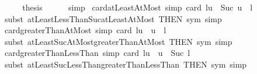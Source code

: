 \begin{isabellebody}
\ \ \isamarkupfalse%
\ \isamarkupfalse%
\ {\isacharquery}{\kern0pt}thesis\isanewline
\ \ \ \ \isamarkupfalse%
\ simp\isanewline
{}\isamarkupfalse%
%
\endisatagproof
{\isafoldproof}%
%
\isadelimproof
\isanewline
%
\endisadelimproof
\isanewline
{}\isamarkupfalse%
\ card{\isacharunderscore}{\kern0pt}atLeastAtMost\ {\isacharbrackleft}{\kern0pt}simp{\isacharbrackright}{\kern0pt}{\isacharcolon}{\kern0pt}\ {\isachardoublequoteopen}card\ {\isacharbraceleft}{\kern0pt}l{\isachardot}{\kern0pt}{\isachardot}{\kern0pt}u{\isacharbraceright}{\kern0pt}\ {\isacharequal}{\kern0pt}\ Suc\ u\ {\isacharminus}{\kern0pt}\ l{\isachardoublequoteclose}\isanewline
%
\isadelimproof
\ \ %
\endisadelimproof
%
\isatagproof
{}\isamarkupfalse%
\ {\isacharparenleft}{\kern0pt}subst\ atLeastLessThanSuc{\isacharunderscore}{\kern0pt}atLeastAtMost\ {\isacharbrackleft}{\kern0pt}THEN\ sym{\isacharbrackright}{\kern0pt}{\isacharcomma}{\kern0pt}\ simp{\isacharparenright}{\kern0pt}%
\endisatagproof
{\isafoldproof}%
%
\isadelimproof
\isanewline
%
\endisadelimproof
\isanewline
{}\isamarkupfalse%
\ card{\isacharunderscore}{\kern0pt}greaterThanAtMost\ {\isacharbrackleft}{\kern0pt}simp{\isacharbrackright}{\kern0pt}{\isacharcolon}{\kern0pt}\ {\isachardoublequoteopen}card\ {\isacharbraceleft}{\kern0pt}l{\isacharless}{\kern0pt}{\isachardot}{\kern0pt}{\isachardot}{\kern0pt}u{\isacharbraceright}{\kern0pt}\ {\isacharequal}{\kern0pt}\ u\ {\isacharminus}{\kern0pt}\ l{\isachardoublequoteclose}\isanewline
%
\isadelimproof
\ \ %
\endisadelimproof
%
\isatagproof
{}\isamarkupfalse%
\ {\isacharparenleft}{\kern0pt}subst\ atLeastSucAtMost{\isacharunderscore}{\kern0pt}greaterThanAtMost\ {\isacharbrackleft}{\kern0pt}THEN\ sym{\isacharbrackright}{\kern0pt}{\isacharcomma}{\kern0pt}\ simp{\isacharparenright}{\kern0pt}%
\endisatagproof
{\isafoldproof}%
%
\isadelimproof
\isanewline
%
\endisadelimproof
\isanewline
{}\isamarkupfalse%
\ card{\isacharunderscore}{\kern0pt}greaterThanLessThan\ {\isacharbrackleft}{\kern0pt}simp{\isacharbrackright}{\kern0pt}{\isacharcolon}{\kern0pt}\ {\isachardoublequoteopen}card\ {\isacharbraceleft}{\kern0pt}l{\isacharless}{\kern0pt}{\isachardot}{\kern0pt}{\isachardot}{\kern0pt}{\isacharless}{\kern0pt}u{\isacharbraceright}{\kern0pt}\ {\isacharequal}{\kern0pt}\ u\ {\isacharminus}{\kern0pt}\ Suc\ l{\isachardoublequoteclose}\isanewline
%
\isadelimproof
\ \ %
\endisadelimproof
%
\isatagproof
{}\isamarkupfalse%
\ {\isacharparenleft}{\kern0pt}subst\ atLeastSucLessThan{\isacharunderscore}{\kern0pt}greaterThanLessThan\ {\isacharbrackleft}{\kern0pt}THEN\ sym{\isacharbrackright}{\kern0pt}{\isacharcomma}{\kern0pt}\ simp{\isacharparenright}{\kern0pt}%

\end{isabellebody}
